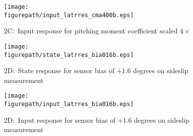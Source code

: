 \begin{figure}[H]
  \begin{center}
    \texttt{[image: \\figurepath/input\_latrres\_cma400b.eps]}
    \caption{2C:\ Input response for pitching moment coefficient scaled $4\times$}
  \end{center}
\end{figure}

\begin{figure}[H]
  \begin{center}
    \texttt{[image: \\figurepath/state\_latrres\_bia016b.eps]}
    \caption{2D:\ State response for sensor bias of $+1.6$ degrees on sideslip measurement}
  \end{center}
\end{figure}

\begin{figure}[H]
  \begin{center}
    \texttt{[image: \\figurepath/input\_latrres\_bia016b.eps]}
    \caption{2D:\ Input response for sensor bias of $+1.6$ degrees on sideslip measurement}
  \end{center}
\end{figure}
